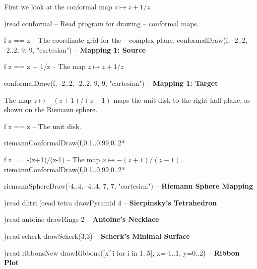 
First we look at the conformal
map $z \mapsto z + 1/z$.

\begin{xmpLinesPlain}
)read conformal                                          -- Read program for drawing
                                                         -- \quad{}conformal maps.

f z == z                                                 -- The coordinate grid for the
                                                         -- \quad{}complex plane.
conformalDraw(f, -2..2, -2..2, 9, 9, "cartesian")        -- \textbf{Mapping 1: Source}

f z == z + 1/z                                           -- The map $z \mapsto z + 1/z$

conformalDraw(f, -2..2, -2..2, 9, 9, "cartesian")        -- \bf{Mapping 1: Target}
\end{xmpLinesPlain}

The map $z \mapsto -(z+1)/(z-1)$ maps
the unit disk to the right half-plane, as shown
on the Riemann sphere.

\begin{xmpLinesNoResetPlain}
f z == z                                                 -- The unit disk.

riemannConformalDraw(f,0.1..0.99,0..2*%

f z == -(z+1)/(z-1)                                      -- The map $x\mapsto -(z+1)/(z-1)$.
riemannConformalDraw(f,0.1..0.99,0..2*%

riemannSphereDraw(-4..4, -4..4, 7, 7, "cartesian")       -- \textbf{Riemann Sphere Mapping}
\end{xmpLinesNoResetPlain}


\begin{xmpLinesPlain}
)read dhtri
)read tetra
drawPyramid 4                                            -- \textbf{Sierpinsky's Tetrahedron}

)read antoine
drawRings 2                                              -- \textbf{Antoine's Necklace}

)read scherk
drawScherk(3,3)                                          -- \textbf{Scherk's Minimal Surface}

)read ribbonsNew
drawRibbons([x^i for i in 1..5], x=-1..1, y=0..2)        -- \bf{Ribbon Plot}
\end{xmpLinesPlain}


